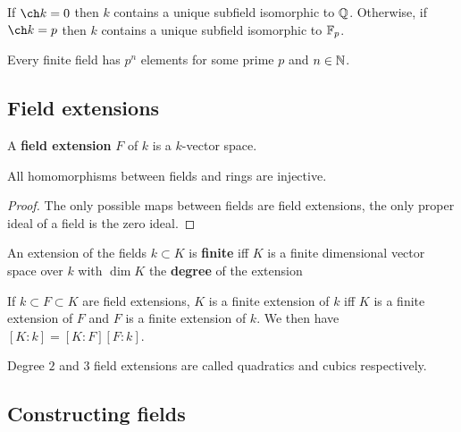 \documentclass{report}
\begin{document}
\begin{proposition}
    If $\ch k=0$ then $k$ contains a unique subfield isomorphic to $\mathbb{Q}$. Otherwise, if $\ch k = p$ then $k$ contains a unique subfield isomorphic to $\mathbb{F}_p$.
\end{proposition}

\begin{theorem}
    Every finite field has $p^n$ elements for some prime $p$ and $n\in\mathbb{N}$.
\end{theorem}

\subsection{Field extensions}

\begin{definition}
    A \textbf{field extension} $F$ of $k$ is a $k$-vector space.
\end{definition}

\begin{proposition}
    All homomorphisms between fields and rings are injective.
    \begin{proof}
        The only possible maps between fields are field extensions, the only proper ideal of a field is the zero ideal.
    \end{proof}
\end{proposition}

\begin{definition}
    An extension of the fields $k\subset K$ is \textbf{finite} iff $K$ is a finite dimensional vector space over $k$ with $\dim K$ the \textbf{degree} of the extension
\end{definition}

\begin{theorem}
    If $k\subset F\subset K$ are field extensions, $K$ is a finite extension of $k$ iff $K$ is a finite extension of $F$ and $F$ is a finite extension of $k$. We then have $[K:k]=[K:F][F:k]$.
\end{theorem}

\begin{remark}
    Degree $2$ and $3$ field extensions are called quadratics and cubics respectively.
\end{remark}

\subsection{Constructing fields}
\end{document}
